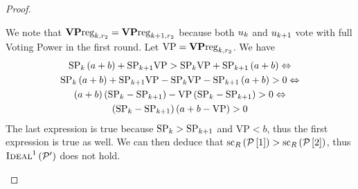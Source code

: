 \begin{proof}
\begin{itemize}
    We note that $\mathrm{\textbf{VP}reg}_{k, r_2} = \mathrm{\textbf{VP}reg}_{k+1, r_2}$ because
    both $u_k$ and $u_{k+1}$ vote with full Voting Power in the
    first round. Let $\mathrm{VP} = \mathrm{\textbf{VP}reg}_{k, r_2}$. We have
    \begin{gather*}
      \mathrm{SP}_k \left(a + b\right) + \mathrm{SP}_{k+1} \mathrm{VP} > \mathrm{SP}_k
      \mathrm{VP} + \mathrm{SP}_{k+1} \left(a + b\right) \Leftrightarrow \\
      \mathrm{SP}_k \left(a + b\right) + \mathrm{SP}_{k+1} \mathrm{VP} - \mathrm{SP}_k
      \mathrm{VP} - \mathrm{SP}_{k+1} \left(a + b\right) > 0 \Leftrightarrow \\
      \left(a + b\right) \left(\mathrm{SP}_k - \mathrm{SP}_{k+1}\right) - \mathrm{VP}
      \left(\mathrm{SP}_k - \mathrm{SP}_{k+1}\right) > 0 \Leftrightarrow \\
      \left(\mathrm{SP}_k - \mathrm{SP}_{k+1}\right) \left(a + b - \mathrm{VP}\right) > 0
    \end{gather*}
    The last expression is true because $\mathrm{SP}_k > \mathrm{SP}_{k+1}$ and
    $\mathrm{VP} < b$, thus the first expression is true as well. We can then
    deduce that $\mathrm{sc}_R\left(\mathcal{P}\left[1\right]\right) >
    \mathrm{sc}_R\left(\mathcal{P}\left[2\right]\right)$, thus
    $\textsc{Ideal}^1\left(\mathcal{P}'\right)$ does not hold.


\end{itemize}
\end{proof}
